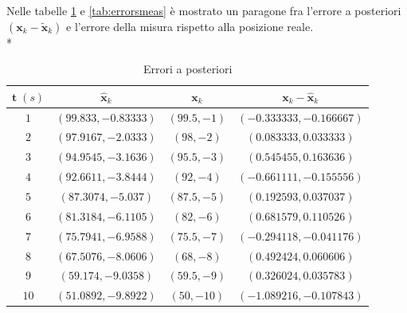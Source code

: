 Nelle tabelle \ref{tab:errors} e \ref{tab:errorsmeas} \`e mostrato un paragone fra l'errore a posteriori $(\mathbf x_k - \mathbf{\tilde{x}}_k)$ e l'errore della misura rispetto alla posizione reale.\\*
\begin{table}[h]
	\begin{tabular}{|c|c|c|c|}
		\hline 
		$\mathbf{t}\;(s)$ & $\mathbf{\hat{x}}_k$ & $\mathbf x_k$ & $\mathbf x_k - \mathbf{\hat{x}}_k$ \\ 
		\hline 
		$1$&$(99.833,-0.83333)$&$(99.5,-1)$  & $(-0.333333,-0.166667)$
		   \\ 
		\hline 
		$2$&$(97.9167,-2.0333)$ & $(98,-2)$ & $(0.083333,0.033333)$
		
		   \\ 
		\hline 
		$3$& $(94.9545,-3.1636)$ & $(95.5,-3)$ & $(0.545455,0.163636)$
		
		  \\ 
		\hline 
		$4$&  $(92.6611,-3.8444)$ & $(92,-4)$ &$(-0.661111,-0.155556)$
		
		  \\ 
		\hline 
		$5$&$(87.3074,-5.037)$  & $(87.5,-5)$ &  $(0.192593,0.037037)$
		  \\ 
		\hline 
		$6$& $(81.3184,-6.1105)$ & $(82,-6)$ &  $(0.681579,0.110526)$
		  \\ 
		\hline 
		$7$&  $(75.7941,-6.9588)$ & $(75.5,-7)$ &  $(-0.294118,-0.041176)$
		  \\ 
		\hline 
		$8$& $(67.5076,-8.0606)$ & $(68,-8)$ &  $(0.492424,0.060606)$
		  \\ 
		\hline 
		$9$&  $(59.174,-9.0358)$ & $(59.5,-9)$ &  $(0.326024,0.035783)$
		  \\ 
		\hline 
		$10$& $(51.0892,-9.8922)$ & $(50,-10)$ & $(-1.089216,-0.107843)$
		  \\ 
		\hline 
	\end{tabular} 
	\caption{Errori a posteriori}
	\label{tab:errors}
\end{table}
